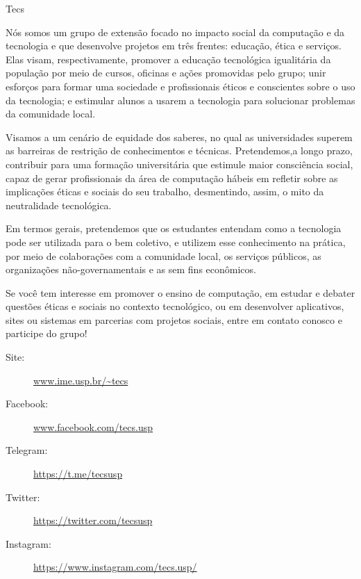
\begin{subsecao}{Tecs}


Nós somos um grupo de extensão focado no impacto social da computação e da 
tecnologia e que desenvolve projetos em três frentes: educação, ética e 
serviços. Elas visam, respectivamente, promover a educação tecnológica 
igualitária da população por meio de cursos, oficinas e ações promovidas pelo 
grupo; unir esforços para formar uma sociedade e profissionais éticos e
conscientes sobre o uso da tecnologia; e estimular alunos a usarem a tecnologia 
para solucionar problemas da comunidade local.

Visamos a um cenário de equidade dos saberes, no qual as universidades superem
as barreiras de restrição de conhecimentos e técnicas. Pretendemos,a longo prazo,
contribuir para uma formação universitária que estimule maior consciência social, 
capaz de gerar profissionais da área de computação hábeis em refletir sobre as 
implicações éticas e sociais do seu trabalho, desmentindo, assim, o mito da 
neutralidade tecnológica.

Em termos gerais, pretendemos que os estudantes entendam como a tecnologia pode
ser utilizada para o bem coletivo, e utilizem esse conhecimento na prática, por
meio de colaborações com a comunidade local, os serviços públicos, as
organizações não-governamentais e as sem fins econômicos. 

Se você tem interesse em promover o ensino de computação, em estudar e debater 
questões éticas e sociais no contexto tecnológico, ou em desenvolver aplicativos,
sites ou sistemas em parcerias com projetos sociais, entre em contato conosco e 
participe do grupo!

\vspace{-1em}
\begin{description}
  \item[Site:] \url{www.ime.usp.br/~tecs}
  \item[Facebook:] \url{www.facebook.com/tecs.usp}
  \item[Telegram:] \url{https://t.me/tecsusp}
  \item[Twitter: ] \url{https://twitter.com/tecsusp}
  \item[Instagram: ] \url{https://www.instagram.com/tecs.usp/} 
\end{description}

\end{subsecao}
